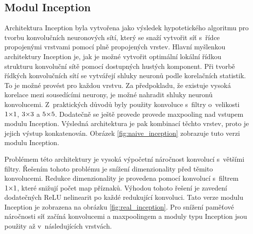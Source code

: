 \subsection{Modul Inception}
\label{sub:inception_module}

Architektura Inception byla vytvořena jako výsledek hypotetického algoritmu pro tvorbu konvolučních neuronových sítí, který se snaží vytvořit síť s~řídce propojenými vrstvami pomocí plně propojených vrstev.
Hlavní myšlenkou architektury Inception je, jak je možné vytvořit optimální lokální řídkou strukturu konvoluční sítě pomocí dostupných hustých komponent.
Při tvorbě řídkých konvolučních sítí se vytvářejí shluky neuronů podle korelačních statistik.
To je možné provést pro každou vrstvu.
Za předpokladu, že existuje vysoká korelace mezi sousedícími neurony, je možné nahradit shluky neuronů konvolucemi.
Z~praktických důvodů byly použity konvoluce s~filtry o~velikosti $\sisetup{tight-spacing=true}1{\times}1$, $\sisetup{tight-spacing=true}3{\times}3$ a $\sisetup{tight-spacing=true}5{\times}5$.
Dodatečně se ještě provede provede maxpooling nad vstupem modulu Inception.
Výsledná architektura je pak kombinací těchto vrstev, proto je jejich výstup konkatenován.
Obrázek \ref{fig:naive_inception} zobrazuje tuto verzi modulu Inception.

Problémem této architektury je vysoká výpočetní náročnost konvolucí s~většími filtry.
Řešením tohoto problému je snížení dimenzionality před těmito konvolucemi.
Redukce dimenzionality je provedena pomocí konvolucí s~filtrem $\sisetup{tight-spacing=true}1{\times}1$, které snižují počet map příznaků.
Výhodou tohoto řešení je zavedení dodatečných ReLU nelinearit po každé redukující konvoluci.
Tato verze modulu Inception je zobrazena na obrázku \ref{fig:real_inception}.
Pro snížení paměťové náročnosti síť začíná konvolucemi a maxpoolingem a moduly typu Inception jsou použity až v~následujících vrstvách.


